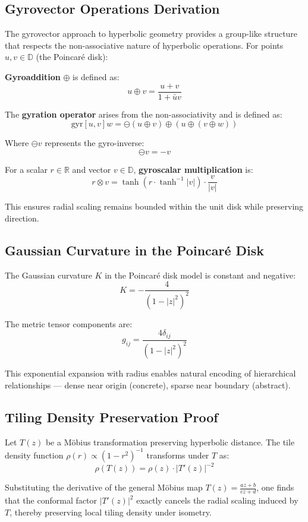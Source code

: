 \documentclass[10pt]{article}
\begin{document}
\subsection{Gyrovector Operations Derivation}

The gyrovector approach to hyperbolic geometry provides a group-like structure that respects the non-associative nature of hyperbolic operations. For points $ u, v \in \mathbb{D} $ (the Poincaré disk):

\textbf{Gyroaddition} $ \oplus $ is defined as:
$$
u \oplus v = \frac{u + v}{1 + \bar{u}v}
$$

The \textbf{gyration operator} arises from the non-associativity and is defined as:
$$
\text{gyr}[u,v]w = \ominus(u \oplus v) \oplus (u \oplus (v \oplus w))
$$

Where $ \ominus v $ represents the gyro-inverse:
$$
\ominus v = -v
$$

For a scalar $ r \in \mathbb{R} $ and vector $ v \in \mathbb{D} $, \textbf{gyroscalar multiplication} is:
$$
r \otimes v = \tanh(r \cdot \tanh^{-1}|v|) \cdot \frac{v}{|v|}
$$

This ensures radial scaling remains bounded within the unit disk while preserving direction.

\subsection{Gaussian Curvature in the Poincaré Disk}

The Gaussian curvature $ K $ in the Poincaré disk model is constant and negative:
$$
K = -\frac{4}{(1-|z|^2)^2}
$$

The metric tensor components are:
$$
g_{ij} = \frac{4\delta_{ij}}{(1-|z|^2)^2}
$$

This exponential expansion with radius enables natural encoding of hierarchical relationships — dense near origin (concrete), sparse near boundary (abstract).

\subsection{Tiling Density Preservation Proof}

Let $ T(z) $ be a Möbius transformation preserving hyperbolic distance. The tile density function $ \rho(r) \propto (1 - r^2)^{-1} $ transforms under $ T $ as:
$$
\rho(T(z)) = \rho(z) \cdot |T'(z)|^{-2}
$$

Substituting the derivative of the general Möbius map $ T(z) = \frac{az + b}{cz + d} $, one finds that the conformal factor $ |T'(z)|^2 $ exactly cancels the radial scaling induced by $ T $, thereby preserving local tiling density under isometry.
\end{document}
